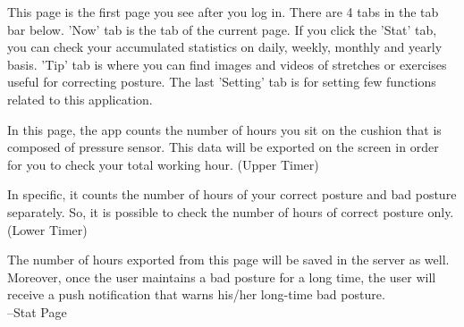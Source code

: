 \documentclass[conference]{IEEEtran}
\begin{document}
 This page is the first page you see after you log in. There are 4 tabs in the tab bar below. 'Now' tab is the tab of the current page. If you click the 'Stat' tab, you can check your accumulated statistics on daily, weekly, monthly  and yearly basis. 'Tip' tab is where you can find images and videos of stretches or exercises useful for correcting posture. The last 'Setting' tab is for setting few functions related to this application.

 In this page, the app counts the number of hours you sit on the cushion that is composed of pressure sensor. This data will be exported on the screen in order for you to check your total working hour. (Upper Timer)
 
In specific, it counts the number of hours of your correct posture and bad posture separately. So, it is possible to check the number of hours of correct posture only. (Lower Timer)

 The number of hours exported from this page will be saved in the server as well. Moreover, once the user maintains a bad posture for a long time, the user will receive a push notification that warns his/her long-time bad  posture.\\

 --Stat Page
\end{document}
